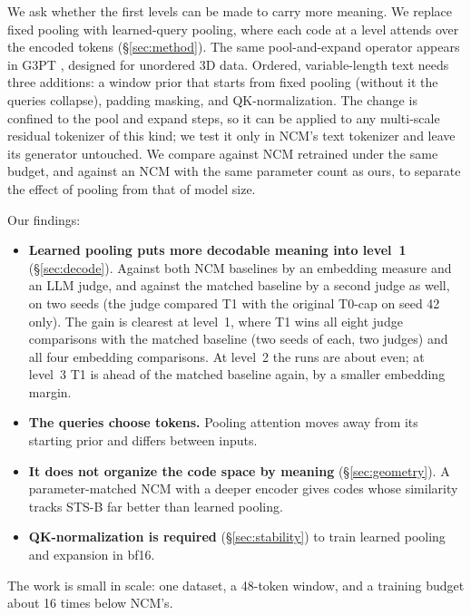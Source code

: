 \documentclass[11pt]{article}
\begin{document}
We ask whether the first levels can be made to carry more meaning. We replace fixed pooling with learned-query pooling, where each code at a level attends over the encoded tokens (\S\ref{sec:method}). The same pool-and-expand operator appears in G3PT \citep{zhang2025g3pt}, designed for unordered 3D data. Ordered, variable-length text needs three additions: a window prior that starts from fixed pooling (without it the queries collapse), padding masking, and QK-normalization. The change is confined to the pool and expand steps, so it can be applied to any multi-scale residual tokenizer of this kind; we test it only in NCM's text tokenizer and leave its generator untouched. We compare against NCM retrained under the same budget, and against an NCM with the same parameter count as ours, to separate the effect of pooling from that of model size.

Our findings:
\begin{itemize}
\item \textbf{Learned pooling puts more decodable meaning into level~1} (\S\ref{sec:decode}). Against both NCM baselines by an embedding measure and an LLM judge, and against the matched baseline by a second judge as well, on two seeds (the judge compared T1 with the original T0-cap on seed 42 only). The gain is clearest at level~1, where T1 wins all eight judge comparisons with the matched baseline (two seeds of each, two judges) and all four embedding comparisons. At level~2 the runs are about even; at level~3 T1 is ahead of the matched baseline again, by a smaller embedding margin.
\item \textbf{The queries choose tokens.} Pooling attention moves away from its starting prior and differs between inputs.
\item \textbf{It does not organize the code space by meaning} (\S\ref{sec:geometry}). A parameter-matched NCM with a deeper encoder gives codes whose similarity tracks STS-B far better than learned pooling.
\item \textbf{QK-normalization is required} (\S\ref{sec:stability}) to train learned pooling and expansion in bf16.
\end{itemize}
The work is small in scale: one dataset, a 48-token window, and a training budget about 16 times below NCM's.
\end{document}
